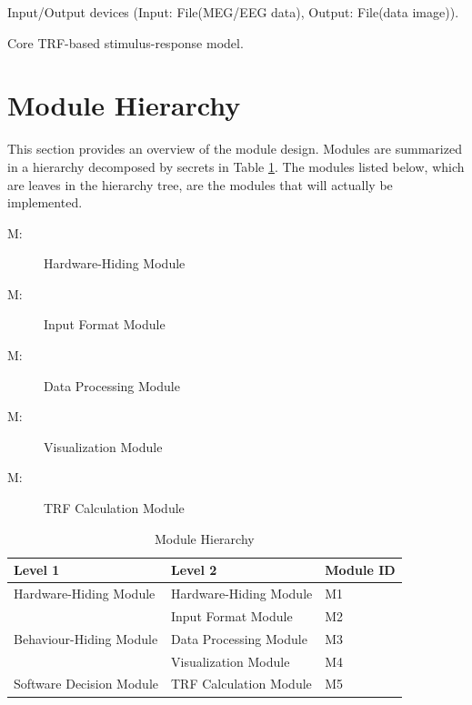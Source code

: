 \documentclass[12pt, titlepage]{article}
\newcounter{ucnum}
\newcommand{\uctheucnum}{UC\theucnum}
\newcounter{mnum}
\newcommand{\mthemnum}{M\themnum}
\begin{document}
\begin{description}
\item[ \uctheucnum \label{ucIO}:] Input/Output devices
  (Input: File(MEG/EEG data), Output: File(data image)).
\item [ \uctheucnum \label{ucCoreTRFmodel}:] Core TRF-based stimulus-response model.
\item
\end{description}

\section{Module Hierarchy} \label{SecMH}

This section provides an overview of the module design. Modules are summarized
in a hierarchy decomposed by secrets in Table \ref{TblMH}. The modules listed
below, which are leaves in the hierarchy tree, are the modules that will
actually be implemented.

\begin{description}
\item [ \mthemnum \label{mHH}:] Hardware-Hiding Module
\item [ \mthemnum \label{m2}:] Input Format Module
\item [ \mthemnum \label{m3}:] Data Processing Module
\item [ \mthemnum \label{m4}:] Visualization Module
\item [ \mthemnum \label{m5}:] TRF Calculation Module
\end{description}


\begin{table}[h!]
\centering
\begin{tabular}{p{} p{}p{}}
\toprule
\textbf{Level 1} & \textbf{Level 2}& \textbf{Module ID}\\
\midrule

{Hardware-Hiding Module} &  Hardware-Hiding Module
 & M1 \\
\midrule

\multirow{3}{0.3\textwidth}{Behaviour-Hiding Module}
& Input Format Module & M2\\
& Data Processing Module & M3\\
& Visualization Module & M4\\

\midrule

\multirow{1}{0.3\textwidth}{Software Decision Module} & TRF Calculation Module & M5\\
\bottomrule

\end{tabular}
\caption{Module Hierarchy}
\label{TblMH}
\end{table}
\end{document}
